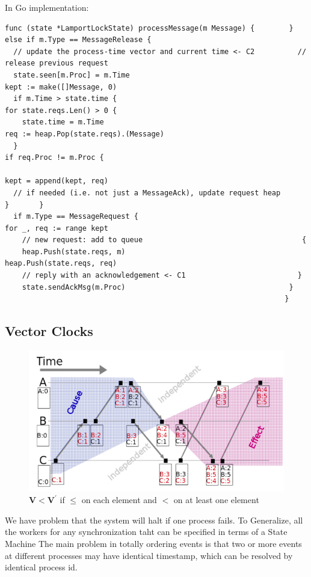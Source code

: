 \documentclass[acmlarge]{acmart}
\begin{document}
In Go implementation:

\begin{lstlisting}
func (state *LamportLockState) processMessage(m Message) {        } else if m.Type == MessageRelease {       
  // update the process-time vector and current time <- C2          // release previous request       
  state.seen[m.Proc] = m.Time                                       kept := make([]Message, 0)               
  if m.Time > state.time {                                          for state.reqs.Len() > 0 {             
    state.time = m.Time                                              req := heap.Pop(state.reqs).(Message)         
  }                                                                   if req.Proc != m.Proc {                           
                                                                      kept = append(kept, req) 
  // if needed (i.e. not just a MessageAck), update request heap      }       }      
  if m.Type == MessageRequest {                                     for _, req := range kept 
    // new request: add to queue                                     {                      
    heap.Push(state.reqs, m)                                          heap.Push(state.reqs, req)                   
    // reply with an acknowledgement <- C1                          }                                     
    state.sendAckMsg(m.Proc)                                      }
                                                                 }      
  \end{lstlisting}

\subsection{Vector Clocks}
\begin{figure}[h]
  \centering
  \includegraphics[width=0.5\linewidth]{vec_lock.png}
  \caption{$\mathbf{V}<\mathbf{V}^{\prime}$ if $\leq$ on each element and $<$ on at least one element}
\end{figure}
We have problem that the system will halt if one process fails. To Generalize, all the workers for any synchronization taht can be specified in terms of a State Machine
The main problem in totally ordering events is that two or more events at different processes may have identical timestamp, which can be resolved by identical process id.
\end{document}
